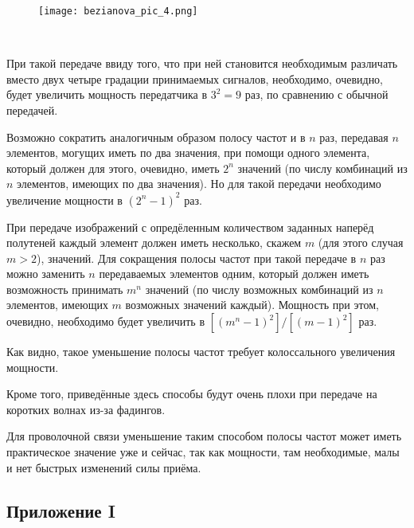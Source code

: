\begin{figure}[H]
        \centering
        \texttt{[image: bezianova\_pic\_4.png]}
        \caption{~}
        \label{fig::bezianova_pic_4}
    \end{figure}

При такой передаче ввиду того, что при ней становится необходимым различать вместо двух четыре градации принимаемых сигналов, необходимо, очевидно, будет увеличить мощность передатчика в $3^2=9$ раз, по сравнению с обычной передачей.

Возможно сократить аналогичным образом полосу частот и в $n$ раз, передавая $n$ элементов, могущих иметь по два значения, при помощи одного элемента, который должен для этого, очевидно, иметь $2^n$ значений (по числу комбинаций из $n$ элементов, имеющих по два значения). Но для такой передачи необходимо увеличение мощности в $\left(2^n-1\right)^2$ раз.

При передаче изображений с опредёленным количеством заданных наперёд полутеней каждый элемент должен иметь несколько, скажем $m$ (для этого случая $m>2$), значений. Для сокращения полосы частот при такой передаче в $n$ раз можно заменить $n$ передаваемых элементов одним, который должен иметь возможность принимать $m^n$ значений (по числу возможных комбинаций из $n$ элементов, имеющих $m$ возможных значений каждый). Мощность при этом, очевидно, необходимо будет увеличить в $\left[\left(m^n-1\right)^2\right] /\left[(m-1)^2\right]$ раз.

Как видно, такое уменьшение полосы частот требует колоссального увеличения мощности.

Кроме того, приведённые здесь способы будут очень плохи при передаче на коротких волнах из-за фадингов.

Для проволочной связи уменьшение таким способом полосы частот может иметь практическое значение уже и сейчас, так как мощности, там необходимые, малы и нет быстрых изменений силы приёма.

\subsection*{Приложение I}

